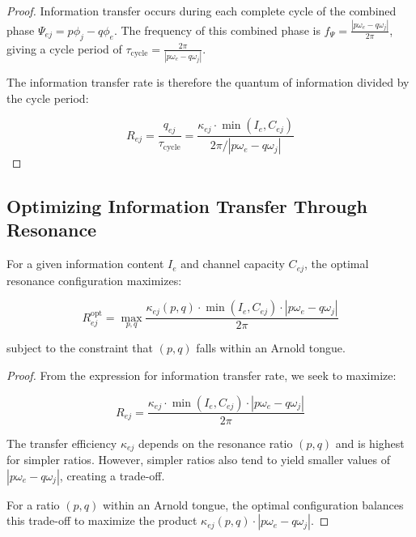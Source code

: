 \begin{proof}
Information transfer occurs during each complete cycle of the combined phase $\Psi_{ej} = p\phi_j - q\phi_e$. The frequency of this combined phase is $f_{\Psi} = \frac{|p\omega_e - q\omega_j|}{2\pi}$, giving a cycle period of $\tau_{\text{cycle}} = \frac{2\pi}{|p\omega_e - q\omega_j|}$.

The information transfer rate is therefore the quantum of information divided by the cycle period:

\begin{equation}
R_{ej} = \frac{q_{ej}}{\tau_{\text{cycle}}} = \frac{\kappa_{ej} \cdot \min\left(I_e, C_{ej}\right)}{2\pi/|p\omega_e - q\omega_j|}
\end{equation}
\end{proof}

\subsection{Optimizing Information Transfer Through Resonance}

\begin{theorem}
For a given information content $I_e$ and channel capacity $C_{ej}$, the optimal resonance configuration maximizes:

\begin{equation}
R_{ej}^{\text{opt}} = \max_{p,q} \frac{\kappa_{ej}(p,q) \cdot \min\left(I_e, C_{ej}\right) \cdot |p\omega_e - q\omega_j|}{2\pi}
\end{equation}

subject to the constraint that $(p,q)$ falls within an Arnold tongue.
\end{theorem}

\begin{proof}
From the expression for information transfer rate, we seek to maximize:

\begin{equation}
R_{ej} = \frac{\kappa_{ej} \cdot \min\left(I_e, C_{ej}\right) \cdot |p\omega_e - q\omega_j|}{2\pi}
\end{equation}

The transfer efficiency $\kappa_{ej}$ depends on the resonance ratio $(p,q)$ and is highest for simpler ratios. However, simpler ratios also tend to yield smaller values of $|p\omega_e - q\omega_j|$, creating a trade-off.

For a ratio $(p,q)$ within an Arnold tongue, the optimal configuration balances this trade-off to maximize the product $\kappa_{ej}(p,q) \cdot |p\omega_e - q\omega_j|$.
\end{proof}

